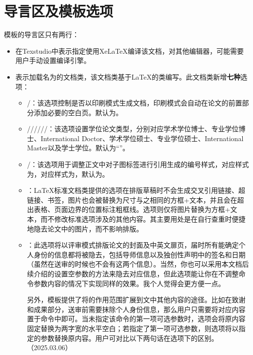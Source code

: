 \documentclass[print, doctor, vlined]{DissertUESTC}
\begin{document}
	\section{导言区及模板选项}

	模板的导言区只有两行：
	\begin{itemize}
		\item {}在Texstudio中表示指定使用XeLaTeX编译该文档，对其他编辑器，可能需要用户手动设置编译引擎。

		\item {}表示加载名为的文档类，该文档类基于LaTeX的类编写。此文档类新增\textbf{\color{DarkRed}七种}选项：

		\begin{itemize}
			\item {}/：该选项控制是否以印刷模式生成文档，印刷模式会自动在论文的前置部分添加必要的空白页。默认为。

			\item {}//////：该选项设置学位论文类型，分别对应学术学位博士、专业学位博士、International Doctor、学术学位硕士、专业学位硕士、International Master以及学士学位。默认为“”。
   
			\item {}/：该选项用于调整正文中对子图标签进行引用生成的编号样式，对应样式为，对应样式为，默认为。
   
			\item {}：LaTeX标准文档类提供的选项在排版草稿时不会生成交叉引用链接、超链接、书签，图片也会被替换为尺寸与之相同的方框+文本，并且会在超出表格、页面边界的位置标注粗框线。选项则仅将图片替换为方框+文本，而不修改标准选项涉及的其他内容。其主要用处是在自行查重时便捷地隐去论文中的图片，而不影响排版。
			
			\item {}：此选项将以评审模式排版论文的封面及中英文扉页，届时所有能确定个人身份的信息都将被隐去，包括导师信息以及独创性声明中的签名和日期（虽然在送审的时候也不会有这两个信息）。当然，你也可以采用本文档后续介绍的设置空参数的方法来隐去对应信息，但此选项能让你在不调整命令参数内容的情况下实现同样的效果。我个人觉得会更方便一点。
			
			另外，模板提供了将的作用范围扩展到文中其他内容的途径。比如在致谢和成果部分，送审前需要抹除个人身份信息，那么用户只需要将对应内容置于命令中即可。当未指定该命令的第一项可选参数时，选项会将原内容固定替换为两字宽的水平空白；若指定了第一项可选参数，则选项将以指定的参数替换原内容。用户可对比以下两句话在选项下的区别。（2025.03.06）


\end{itemize}
\end{itemize}
\end{document}
